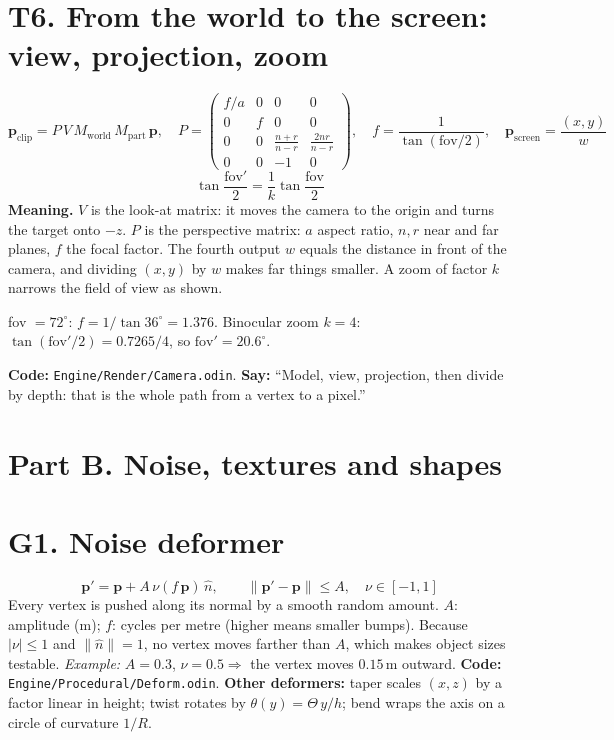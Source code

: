 \documentclass[11pt,a4paper]{article}
\newcommand{\code}[1]{{\small\texttt{#1}}}
\begin{document}
\section{T6. From the world to the screen: view, projection, zoom}
\[\mathbf p_{\text{clip}}=P\,V\,M_{\text{world}}\,M_{\text{part}}\,\mathbf p,\quad P=\begin{pmatrix}f/a&0&0&0\\0&f&0&0\\0&0&\tfrac{n+r}{n-r}&\tfrac{2nr}{n-r}\\0&0&-1&0\end{pmatrix},\quad f=\frac{1}{\tan(\mathrm{fov}/2)},\quad \mathbf p_{\text{screen}}=\frac{(x,y)}{w}\]
\[\tan\frac{\mathrm{fov}'}{2}=\frac{1}{k}\tan\frac{\mathrm{fov}}{2}\]
\textbf{Meaning.} $V$ is the look-at matrix: it moves the camera to the origin and turns the target onto $-z$. $P$ is the perspective matrix: $a$ aspect ratio, $n,r$ near and far planes, $f$ the focal factor. The fourth output $w$ equals the distance in front of the camera, and dividing $(x,y)$ by $w$ makes far things smaller. A zoom of factor $k$ narrows the field of view as shown.
\begin{ex}fov $=72^{\circ}$: $f=1/\tan36^{\circ}=1.376$. Binocular zoom $k=4$: $\tan(\mathrm{fov}'/2)=0.7265/4$, so $\mathrm{fov}'=20.6^{\circ}$.\end{ex}
\textbf{Code:} \code{Engine/Render/Camera.odin}. \textbf{Say:} ``Model, view, projection, then divide by depth: that is the whole path from a vertex to a pixel.''

\section*{Part B. Noise, textures and shapes}

\section{G1. Noise deformer}
\[\mathbf p'=\mathbf p+A\,\nu(f\,\mathbf p)\,\hat n,\qquad \lVert\mathbf p'-\mathbf p\rVert\le A,\quad \nu\in[-1,1]\]
Every vertex is pushed along its normal by a smooth random amount. $A$: amplitude (m); $f$: cycles per metre (higher means smaller bumps). Because $|\nu|\le1$ and $\lVert\hat n\rVert=1$, no vertex moves farther than $A$, which makes object sizes testable. \emph{Example:} $A=0.3$, $\nu=0.5\Rightarrow$ the vertex moves $0.15$\,m outward. \textbf{Code:} \code{Engine/Procedural/Deform.odin}. \textbf{Other deformers:} taper scales $(x,z)$ by a factor linear in height; twist rotates by $\theta(y)=\Theta\,y/h$; bend wraps the axis on a circle of curvature $1/R$.
\end{document}
